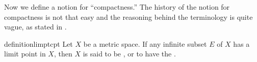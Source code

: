 \label{sec:mcptcnt}

Now we define a notion for ``compactness.''
The history of the notion for compactness is not that easy
and the reasoning behind the terminology is quite vague,
as stated in \cite{cpt-hist}.

\begin{restatable}{definition}{limptcpt}
    \label{def:limptcpt}
    Let \(X\) be a metric space.
    If any infinite subset \(E\) of \(X\) has a limit point in \(X\),
    then \(X\) is said
    to be ,
    or to have the .
\end{restatable}